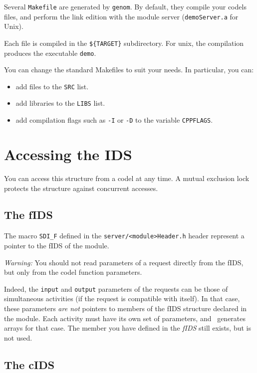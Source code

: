 Several {\tt  Makefile} are generated   by {\tt genom}.  By default, they
compile your codels  files, and perform the  link edition with the module
server ({\tt demoServer.a} for Unix).

Each file  is compiled in the {\tt  \$\{TARGET\}} subdirectory. For unix,
the compilation  produces the executable {\tt demo}.

You can change the standard Makefiles to suit your needs. In particular,
you can:

\begin{itemize}
\item add files to the {\tt SRC} list.
\item add libraries to the {\tt LIBS} list.
\item add compilation flags such as {\tt -I} or {\tt -D} to the  variable
{\tt CPPFLAGS}.
\end{itemize}


\section{Accessing the IDS}

You can access   this  structure from a  codel  at  any time.   A  mutual
exclusion lock protects the structure against concurrent accesses.

\subsection{The fIDS}

The macro {\tt SDI\_F}  defined in the {\tt server/<module>Header.h} header
represent a pointer to the fIDS of the module.

{\em Warning:} 
 You should not read parameters
of  a  request  directly  from the  fIDS,  but only from the codel
function parameters.

Indeed, the   {\tt input}  and {\tt   output} parameters  of   the
requests  can  be those  of simultaneous activities  (if  the  request is
compatible with  itself).  In that case, these  parameters {\em  are not}
pointers to members of  the fIDS structure declared in  the module.  Each
activity  must have  its own  set  of  parameters, and \GenoM\  generates
arrays for that case. The member you have defined in the {\em fIDS} still
exists, but is not used.

\subsection{The cIDS}

